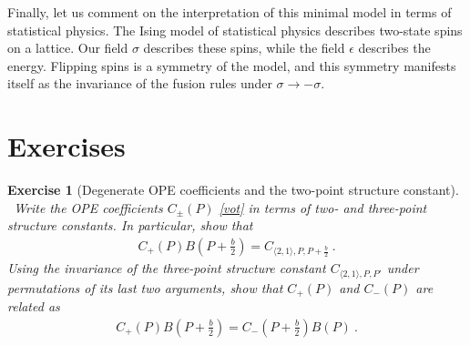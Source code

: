 \documentclass[12pt, a4paper, notitlepage, twoside]{report}
\numberwithin{equation}{section}
\theoremstyle{break}
\newtheorem{exo}{Exercise}[chapter]
\begin{document}
Finally, let us comment on the interpretation of this minimal model in terms of statistical physics.
The Ising model of statistical physics describes two-state spins on a lattice.
Our field $\sigma$ describes these spins, while the field $\epsilon$ describes the energy.
Flipping spins is a symmetry of the model, and this symmetry manifests itself as the invariance of the fusion rules under $\sigma\to -\sigma$. 


\section{Exercises}

\begin{exo}[Degenerate OPE coefficients and the two-point structure constant]
 ~\label{exocpcm}
 Write the OPE coefficients $C_\pm(P)$ \eqref{vot} in terms of two- and three-point structure constants. In particular, show that 
 \begin{align}
  C_+(P)B(P+\tfrac{b}{2}) = C_{\langle 2,1\rangle, P, P+\frac{b}{2}}\ . 
 \end{align}
 Using the invariance of the three-point structure constant $C_{\langle 2,1\rangle, P,P'}$ under permutations of its last two arguments, show that $C_+(P)$ and $C_-(P)$ are related as
 \begin{align}
  C_+(P)B(P+\tfrac{b}{2}) = C_-(P+\tfrac{b}{2}) B(P)\ .
 \end{align}
\end{exo}
\end{document}
